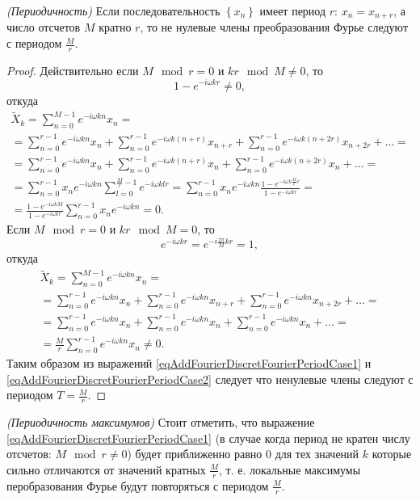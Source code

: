 \begin{lemma}
\emph{(Периодичность)}
\label{lemmaAddFourierDiscretFourierPeriod}
Если последовательность $\left\{x_n\right\}$ имеет период $r$: $x_n =
x_{n + r}$, а число отсчетов $M$ кратно $r$, то не нулевые члены
преобразования Фурье следуют с периодом $\frac{M}{r}$.
\begin{proof}
Действительно если $M \mod r = 0$ и $k r \mod M \ne 0$,
то
\[
1 - e^{-i \omega k r} \ne 0,
\]
откуда
\begin{eqnarray}
\tilde{X}_k = \sum_{n = 0}^{M - 1}e^{-i \omega k n}x_n = 
\nonumber \\
=
\sum_{n = 0}^{r - 1}e^{-i \omega k n} x_n + 
\sum_{n = 0}^{r - 1}e^{-i \omega k \left(n + r \right) } x_{n+r} + 
\sum_{n = 0}^{r - 1}e^{-i \omega k \left(n + 2r \right) } x_{n+2r} + 
\dots =
\nonumber \\
=
\sum_{n = 0}^{r - 1}e^{-i \omega k n} x_n + 
\sum_{n = 0}^{r - 1}e^{-i \omega k \left(n + r \right) } x_n + 
\sum_{n = 0}^{r - 1}e^{-i \omega k \left(n + 2r \right) } x_n + 
\dots =
\nonumber \\
= \sum_{n = 0}^{r - 1} x_n e^{-i \omega k n} 
\sum_{l = 0}^{\frac{M}{r}- 1} e^{-i \omega k l r } = 
\sum_{n = 0}^{r - 1} x_n e^{-i \omega k n} 
\frac{1 - e^{-i \omega k \frac{M}{r} r }}{1 - e^{-i \omega k r }} = 
\nonumber \\
=
\frac{1 - e^{-i \omega k M }}{1 - e^{-i \omega k r}}
\sum_{n = 0}^{r - 1} x_n e^{-i \omega k n} = 0.
\label{eqAddFourierDiscretFourierPeriodCase1}
\end{eqnarray}
Если $M \mod r = 0$ и $k r \mod M = 0$, то
\[
e^{-i \omega k r } = e^{-i \frac{2 \pi }{M} k r } = 1,
\]
откуда
\begin{eqnarray}
\tilde{X}_k = \sum_{n = 0}^{M - 1}e^{-i \omega k n}x_n = 
\nonumber \\
=
\sum_{n = 0}^{r - 1}e^{-i \omega k n} x_n + 
\sum_{n = 0}^{r - 1}e^{-i \omega k n } x_{n+r} + 
\sum_{n = 0}^{r - 1}e^{-i \omega k n } x_{n+2r} + 
\dots =
\nonumber \\
=
\sum_{n = 0}^{r - 1}e^{-i \omega k n} x_n + 
\sum_{n = 0}^{r - 1}e^{-i \omega k n  } x_n + 
\sum_{n = 0}^{r - 1}e^{-i \omega k n  } x_n + 
\dots = 
\nonumber \\ 
= \frac{M}{r} \sum_{n = 0}^{r - 1}e^{-i \omega k n  } x_n \ne 0.
\label{eqAddFourierDiscretFourierPeriodCase2}
\end{eqnarray}
Таким образом из выражений 
\eqref{eqAddFourierDiscretFourierPeriodCase1} и 
\eqref{eqAddFourierDiscretFourierPeriodCase2} следует что
ненулевые члены следуют с периодом $T = \frac{M}{r}$.
\end{proof}
\end{lemma}

\begin{remark}
\emph{(Периодичность максимумов)}
\label{rem:dsp:fourier:periodprop}
Стоит отметить, что выражение 
\eqref{eqAddFourierDiscretFourierPeriodCase1} (в случае когда
период не кратен числу отсчетов: $M \mod r \ne 0$) будет приближенно
равно 0 для тех значений $k$ которые сильно отличаются от значений
кратных $\frac{M}{r}$, т. е. локальные максимумы перобразования Фурье
будут повторяться с периодом $\frac{M}{r}$.
\end{remark}

